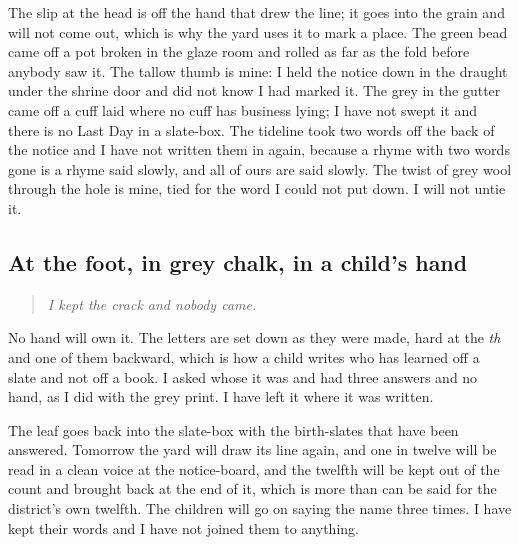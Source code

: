 \documentclass{design/chronicle}
\begin{document}
The slip at the head is off the hand that drew the line; it goes into the grain and will not come out, which is why the yard uses it to mark a place. The green bead came off a pot broken in the glaze room and rolled as far as the fold before anybody saw it. The tallow thumb is mine: I held the notice down in the draught under the shrine door and did not know I had marked it. The grey in the gutter came off a cuff laid where no cuff has business lying; I have not swept it and there is no Last Day in a slate-box. The tideline took two words off the back of the notice and I have not written them in again, because a rhyme with two words gone is a rhyme said slowly, and all of ours are said slowly. The twist of grey wool through the hole is mine, tied for the word I could not put down. I will not untie it.

\subsection*{At the foot, in grey chalk, in a child’s hand}

\begin{quote}\itshape I kept the crack and nobody came.\end{quote}

No hand will own it. The letters are set down as they were made, hard at the \emph{th} and one of them backward, which is how a child writes who has learned off a slate and not off a book. I asked whose it was and had three answers and no hand, as I did with the grey print. I have left it where it was written.

The leaf goes back into the slate-box with the birth-slates that have been answered. Tomorrow the yard will draw its line again, and one in twelve will be read in a clean voice at the notice-board, and the twelfth will be kept out of the count and brought back at the end of it, which is more than can be said for the district’s own twelfth. The children will go on saying the name three times. I have kept their words and I have not joined them to anything.
\end{document}
